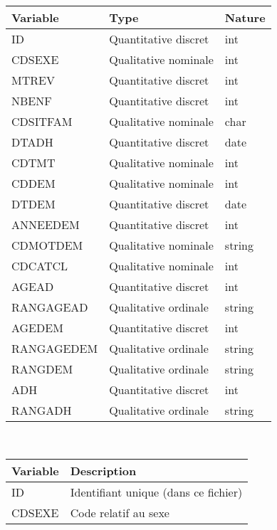 \documentclass{ceri/sty/rapport}
\begin{document}
\begin{table}[htb!]
	\begin{tabular}{l l l}
		\hline
		\textbf{Variable} & \textbf{Type} & \textbf{Nature}	\\ 
		\hline
             ID & Quantitative discret & int \\
             CDSEXE & Qualitative nominale & int \\
             MTREV & Quantitative discret & int \\
             NBENF & Quantitative discret & int \\
             CDSITFAM & Qualitative nominale & char \\
             DTADH & Quantitative discret & date \\
             CDTMT & Qualitative nominale & int \\
             CDDEM & Qualitative nominale & int \\
             DTDEM & Quantitative discret & date \\
             ANNEEDEM & Quantitative discret & int \\
             CDMOTDEM & Qualitative nominale & string \\
             CDCATCL & Qualitative nominale & int \\
             AGEAD & Quantitative discret & int \\
             RANGAGEAD & Qualitative ordinale & string \\
             AGEDEM & Quantitative discret & int \\
             RANGAGEDEM & Qualitative ordinale & string \\
             RANGDEM & Qualitative ordinale & string \\
             ADH & Quantitative discret & int \\
             RANGADH & Qualitative ordinale & string \\
		\hline
	\end{tabular} \\
        \begin{tabular}{l l}
		\hline
		\textbf{Variable} & \textbf{Description} \\ 
		\hline
             ID & Identifiant unique (dans ce fichier) \\
             CDSEXE & Code relatif au sexe \\

\end{tabular}
\end{table}
\end{document}
